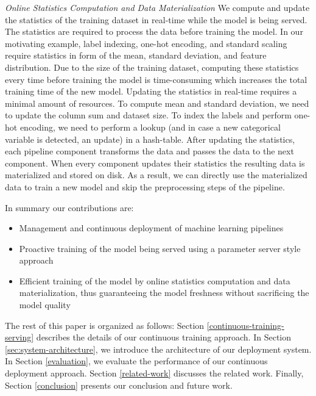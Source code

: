 \textit{Online Statistics Computation and Data Materialization}
We compute and update the statistics of the training dataset in real-time while the model is being served. 
The statistics are required to process the data before training the model.
In our motivating example, label indexing, one-hot encoding, 
and standard scaling require statistics in form of the mean, standard deviation, and feature distribution.
Due to the size of the training dataset, computing these statistics every time before training the model is time-consuming which increases the total training time of the new model.
Updating the statistics in real-time requires a minimal amount of resources. 
To compute mean and standard deviation, we need to update the column sum and dataset size.
To index the labels and perform one-hot encoding, we need to perform a lookup (and in case a new categorical variable is detected, an update) in a hash-table. 
After updating the statistics, each pipeline component transforms the data and passes the data to the next component.
When every component updates their statistics the resulting data is materialized and stored on disk.
As a result, we can directly use the materialized data to train a new model and skip the preprocessing steps of the pipeline.

In summary our contributions are:
\begin{itemize}
\item Management and continuous deployment of machine learning pipelines
\item Proactive training of the model being served using a parameter server style approach
\item Efficient training of the model by online statistics computation and data materialization, thus guaranteeing the model freshness without sacrificing the model quality
\end{itemize}

The rest of this paper is organized as follows:
Section \ref{continuous-training-serving} describes the details of our continuous training approach.
In Section \ref{sec:system-architecture}, we introduce the architecture of our deployment system.
In Section \ref{evaluation}, we evaluate the performance of our continuous deployment approach.
Section \ref {related-work} discusses the related work.
Finally, Section \ref{conclusion} presents our conclusion and future work.
